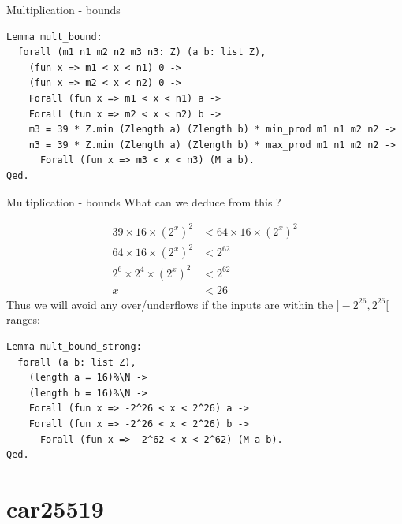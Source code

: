 \documentclass[8pt]{beamer}
\begin{document}
%
%

\begin{frame}[fragile]{Multiplication - bounds}
  \begin{center}
\begin{lstlisting}[language=CoqD, caption=M | Proofs of bounds, label=cod:languageC141]
Lemma mult_bound:
  forall (m1 n1 m2 n2 m3 n3: Z) (a b: list Z),
    (fun x => m1 < x < n1) 0 ->
    (fun x => m2 < x < n2) 0 ->
    Forall (fun x => m1 < x < n1) a ->
    Forall (fun x => m2 < x < n2) b ->
    m3 = 39 * Z.min (Zlength a) (Zlength b) * min_prod m1 n1 m2 n2 ->
    n3 = 39 * Z.min (Zlength a) (Zlength b) * max_prod m1 n1 m2 n2 ->
      Forall (fun x => m3 < x < n3) (M a b).
Qed.
\end{lstlisting}

  \end{center}
\end{frame}

\begin{frame}[fragile]{Multiplication - bounds}
  What can we deduce from this ?
  \begin{center}
  \begin{align*}
    39 \times 16 \times (2^x)^2 &< 64 \times 16 \times (2^x)^2\\
    64 \times 16 \times (2^x)^2 &< 2^{62}\\
    2^6 \times 2^4 \times (2^x)^2 &< 2^{62}\\
    x &< 26
  \end{align*}
  Thus we will avoid any over/underflows if the inputs are within the $]-2^{26},2^{26}[$ ranges:
 \begin{lstlisting}[language=CoqD, caption=M | Proofs of bounds, label=cod:languageC141]
Lemma mult_bound_strong:
  forall (a b: list Z),
    (length a = 16)%\N ->
    (length b = 16)%\N ->
    Forall (fun x => -2^26 < x < 2^26) a ->
    Forall (fun x => -2^26 < x < 2^26) b ->
      Forall (fun x => -2^62 < x < 2^62) (M a b).
Qed.
\end{lstlisting}

  \end{center}
\end{frame}

\section{car25519}

%
%
\end{document}
